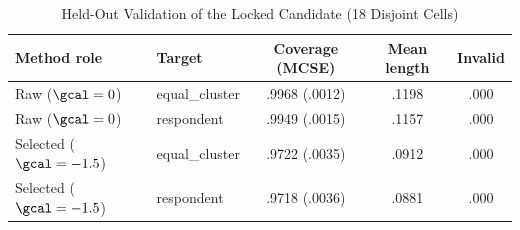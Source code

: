 \begin{table}[H]
\caption{Held-Out Validation of the Locked Candidate (18 Disjoint Cells)}
\label{tab:validation}
\centering
\small
\begin{tabular}{llccc}
\toprule
Method role & Target & Coverage (MCSE) & Mean length & Invalid \\
\midrule
Raw ($\gcal=0$) & equal\_cluster & .9968 (.0012) & .1198 & .000 \\
Raw ($\gcal=0$) & respondent & .9949 (.0015) & .1157 & .000 \\
Selected ($\gcal=-1.5$) & equal\_cluster & .9722 (.0035) & .0912 & .000 \\
Selected ($\gcal=-1.5$) & respondent & .9718 (.0036) & .0881 & .000 \\
\bottomrule
\end{tabular}
\end{table}
